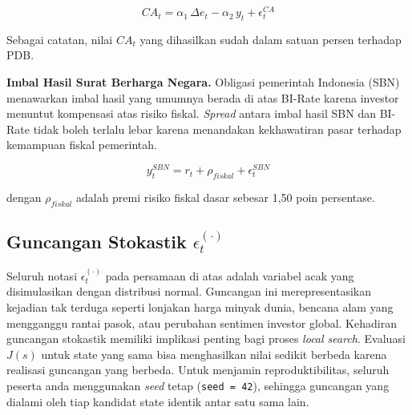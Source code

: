 \[
    CA_t = \alpha_1 \, \Delta e_t - \alpha_2 \, y_t + \epsilon_t^{CA}
\]

Sebagai catatan, nilai $CA_t$ yang dihasilkan sudah dalam satuan persen terhadap PDB.

\textbf{Imbal Hasil Surat Berharga Negara.} Obligasi pemerintah Indonesia (SBN) menawarkan imbal hasil yang umumnya berada di atas BI-Rate karena investor menuntut kompensasi atas risiko fiskal. \textit{Spread} antara imbal hasil SBN dan BI-Rate tidak boleh terlalu lebar karena menandakan kekhawatiran pasar terhadap kemampuan fiskal pemerintah.

\[
    y_t^{SBN} = r_t + \rho_{fiskal} + \epsilon_t^{SBN}
\]

dengan $\rho_{fiskal}$ adalah premi risiko fiskal dasar sebesar 1,50 poin persentase.

\subsection{Guncangan Stokastik $\epsilon_t^{(\cdot)}$}

Seluruh notasi $\epsilon_t^{(\cdot)}$ pada persamaan di atas adalah variabel acak yang disimulasikan dengan distribusi normal. Guncangan ini merepresentasikan kejadian tak terduga seperti lonjakan harga minyak dunia, bencana alam yang mengganggu rantai pasok, atau perubahan sentimen investor global. Kehadiran guncangan stokastik memiliki implikasi penting bagi proses \textit{local search}. Evaluasi $J(s)$ untuk state yang sama bisa menghasilkan nilai sedikit berbeda karena realisasi guncangan yang berbeda. Untuk menjamin reproduktibilitas, seluruh peserta anda menggunakan \textit{seed} tetap (\texttt{seed = 42}), sehingga guncangan yang dialami oleh tiap kandidat state identik antar satu sama lain.

